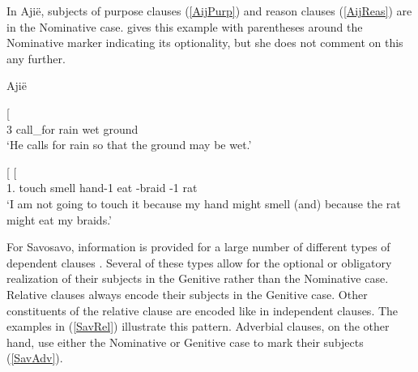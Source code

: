 In Aji\"e, subjects of purpose clauses (\ref{AijPurp}) and reason  clauses (\ref{AijReas}) are in the Nominative  case. 
 gives this example with parentheses around the Nominative marker indicating its optionality, but she does not comment on this any further.

\begin{exe}\ex\label{AijDep} {Aji\"e} \citetext{Oceanic; New Caledonia; \citealt[113]{Lichtenberk:1978} after \citealt[330]{Fontinelle:1976} and \citealt[189, 190]{Fontinelle:1961}}\nopagebreak[4]
\begin{xlist}
\ex\label{AijPurp}\gll{}    {\rm[}   \textbf{} \textipa{ne\textbardotlessj 2\textglotstop}{\rm]}\\
3\sg{} call\_for rain \purp{} \Hyp{} wet \nom{} ground\\
`He calls for rain so that the ground may be wet.' %

\ex\label{AijReas}\gll{}    {\rm[}   \textbf{} \textipa{kOwi-\textltailn}{\rm]}  {\rm[}     \textbf{} \textipa{yiipu}{\rm]}\\
1\sg{}.\prosp{} \Neg{} touch \reas{} \dubt{} smell \nom{} hand-1\sg{} \reas{} \dubt{} eat \coll{}-braid \poss{}-1\sg{} \nom{} rat\\
`I am not going to touch it because my hand might smell (and) because the rat might eat my braids.'%
\end{xlist}
\end{exe}

For {Savosavo}, information is provided for a large number of different types of dependent clauses \citep[254--286]{Wegener:2008}.
Several of these types allow for the optional or obligatory  realization of their subjects in the Genitive rather than the Nominative case.
Relative clauses always encode their subjects in the Genitive case. 
Other constituents of the relative clause are encoded like in independent clauses. 
The examples in (\ref{SavRel}) illustrate this pattern.
Adverbial clauses, on the other hand, use either the Nominative  or Genitive case to mark their subjects (\ref{SavAdv}). 

